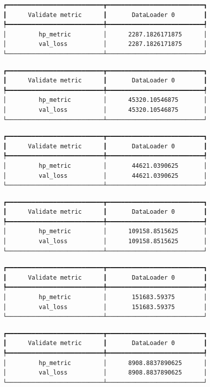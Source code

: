 \documentclass[
  letterpaper,
  DIV=11,
  numbers=noendperiod]{scrreprt}
\begin{document}
\begin{verbatim}
┏━━━━━━━━━━━━━━━━━━━━━━━━━━━┳━━━━━━━━━━━━━━━━━━━━━━━━━━━┓
┃      Validate metric      ┃       DataLoader 0        ┃
┡━━━━━━━━━━━━━━━━━━━━━━━━━━━╇━━━━━━━━━━━━━━━━━━━━━━━━━━━┩
│         hp_metric         │      2287.1826171875      │
│         val_loss          │      2287.1826171875      │
└───────────────────────────┴───────────────────────────┘
\end{verbatim}

\begin{verbatim}
┏━━━━━━━━━━━━━━━━━━━━━━━━━━━┳━━━━━━━━━━━━━━━━━━━━━━━━━━━┓
┃      Validate metric      ┃       DataLoader 0        ┃
┡━━━━━━━━━━━━━━━━━━━━━━━━━━━╇━━━━━━━━━━━━━━━━━━━━━━━━━━━┩
│         hp_metric         │      45320.10546875       │
│         val_loss          │      45320.10546875       │
└───────────────────────────┴───────────────────────────┘
\end{verbatim}

\begin{verbatim}
┏━━━━━━━━━━━━━━━━━━━━━━━━━━━┳━━━━━━━━━━━━━━━━━━━━━━━━━━━┓
┃      Validate metric      ┃       DataLoader 0        ┃
┡━━━━━━━━━━━━━━━━━━━━━━━━━━━╇━━━━━━━━━━━━━━━━━━━━━━━━━━━┩
│         hp_metric         │       44621.0390625       │
│         val_loss          │       44621.0390625       │
└───────────────────────────┴───────────────────────────┘
\end{verbatim}

\begin{verbatim}
┏━━━━━━━━━━━━━━━━━━━━━━━━━━━┳━━━━━━━━━━━━━━━━━━━━━━━━━━━┓
┃      Validate metric      ┃       DataLoader 0        ┃
┡━━━━━━━━━━━━━━━━━━━━━━━━━━━╇━━━━━━━━━━━━━━━━━━━━━━━━━━━┩
│         hp_metric         │      109158.8515625       │
│         val_loss          │      109158.8515625       │
└───────────────────────────┴───────────────────────────┘
\end{verbatim}

\begin{verbatim}
┏━━━━━━━━━━━━━━━━━━━━━━━━━━━┳━━━━━━━━━━━━━━━━━━━━━━━━━━━┓
┃      Validate metric      ┃       DataLoader 0        ┃
┡━━━━━━━━━━━━━━━━━━━━━━━━━━━╇━━━━━━━━━━━━━━━━━━━━━━━━━━━┩
│         hp_metric         │       151683.59375        │
│         val_loss          │       151683.59375        │
└───────────────────────────┴───────────────────────────┘
\end{verbatim}

\begin{verbatim}
┏━━━━━━━━━━━━━━━━━━━━━━━━━━━┳━━━━━━━━━━━━━━━━━━━━━━━━━━━┓
┃      Validate metric      ┃       DataLoader 0        ┃
┡━━━━━━━━━━━━━━━━━━━━━━━━━━━╇━━━━━━━━━━━━━━━━━━━━━━━━━━━┩
│         hp_metric         │      8908.8837890625      │
│         val_loss          │      8908.8837890625      │
└───────────────────────────┴───────────────────────────┘
\end{verbatim}
\end{document}

